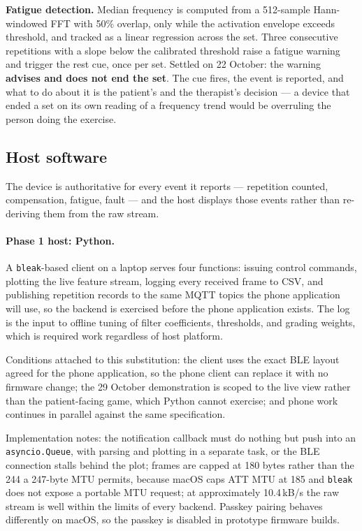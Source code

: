 \documentclass[11pt]{article}
\begin{document}
\medskip
\noindent
\textbf{Fatigue detection.} Median frequency is computed from a 512-sample
Hann-windowed FFT with 50\% overlap, only while the activation envelope exceeds
threshold, and tracked as a linear regression across the set. Three consecutive
repetitions with a slope below the calibrated threshold raise a fatigue warning
and trigger the rest cue, once per set. Settled on 22 October: the warning
\textbf{advises and does not end the set}. The cue fires, the event is
reported, and what to do about it is the patient's and the therapist's
decision --- a device that ended a set on its own reading of a frequency trend
would be overruling the person doing the exercise.

\subsection{Host software}

The device is authoritative for every event it reports --- repetition counted,
compensation, fatigue, fault --- and the host displays those events rather than
re-deriving them from the raw stream.

\paragraph{Phase 1 host: Python.} A \texttt{bleak}-based client on a laptop
serves four functions: issuing control commands, plotting the live feature
stream, logging every received frame to CSV, and publishing repetition records
to the same MQTT topics the phone application will use, so the backend is
exercised before the phone application exists. The log is the input to offline
tuning of filter coefficients, thresholds, and grading weights, which is
required work regardless of host platform.

\smallskip
\noindent
Conditions attached to this substitution: the client uses the exact BLE layout
agreed for the phone application, so the phone client can replace it with no
firmware change; the 29 October demonstration is scoped to the live view rather
than the patient-facing game, which Python cannot exercise; and phone work
continues in parallel against the same specification.

\smallskip
\noindent
Implementation notes: the notification callback must do nothing but push into an
\texttt{asyncio.Queue}, with parsing and plotting in a separate task, or the BLE
connection stalls behind the plot; frames are capped at 180 bytes rather than the
244 a 247-byte MTU permits, because macOS caps ATT MTU at 185 and \texttt{bleak}
does not expose a portable MTU request; at approximately 10.4\,kB/s the raw
stream is well within the limits of every backend. Passkey pairing behaves
differently on macOS, so the passkey is disabled in prototype firmware builds.
\end{document}
